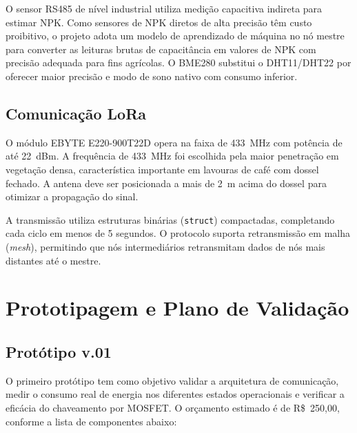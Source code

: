 \documentclass[12pt,a4paper]{article}
\begin{document}
O sensor RS485 de nível industrial utiliza medição capacitiva indireta para estimar
NPK. Como sensores de NPK diretos de alta precisão têm custo proibitivo, o projeto
adota um modelo de aprendizado de máquina no nó mestre para converter as leituras
brutas de capacitância em valores de NPK com precisão adequada para fins agrícolas.
O BME280 substitui o DHT11/DHT22 por oferecer maior precisão e modo de sono nativo
com consumo inferior.

\subsection{Comunicação LoRa}

O módulo EBYTE E220-900T22D opera na faixa de 433~MHz com potência de até 22~dBm.
A frequência de 433~MHz foi escolhida pela maior penetração em vegetação densa,
característica importante em lavouras de café com dossel fechado. A antena deve ser
posicionada a mais de 2~m acima do dossel para otimizar a propagação do sinal.

A transmissão utiliza estruturas binárias (\texttt{struct}) compactadas, completando
cada ciclo em menos de 5 segundos. O protocolo suporta retransmissão em malha
(\textit{mesh}), permitindo que nós intermediários retransmitam dados de nós mais
distantes até o mestre.

\section{Prototipagem e Plano de Validação}

\subsection{Protótipo v.01}

O primeiro protótipo tem como objetivo validar a arquitetura de comunicação, medir
o consumo real de energia nos diferentes estados operacionais e verificar a eficácia
do chaveamento por MOSFET. O orçamento estimado é de R\$~250,00, conforme a lista
de componentes abaixo:
\end{document}
